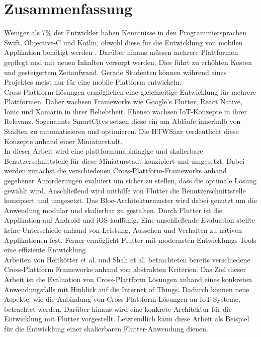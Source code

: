 \chapter*{Zusammenfassung}
Weniger als 7\% der Entwickler haben Kenntnisse in den Programmiersprachen Swift, Objective-C und Kotlin, obwohl diese für die Entwicklung von mobilen Applikation benötigt werden \cite{stachoverflow_stack_2019}. Darüber hinaus müssen mehrere Plattformen gepflegt und mit neuen Inhalten versorgt werden. Dies führt zu erhöhten Kosten und gesteigertem Zeitaufwand. Gerade Studenten können während eines Projektes meist nur für eine mobile Plattform entwickeln.\\
Cross-Plattform-Lösungen ermöglichen eine gleichzeitige Entwicklung für	 mehrere Plattformen. Daher wachsen Frameworks wie Google's Flutter, React Native, Ionic und \mbox{Xamarin} in ihrer Beliebtheit. Ebenso wachsen IoT-Konzepte in ihrer Relevanz. Sogenannte SmartCitys setzen diese ein um Abläufe innerhalb von Städten zu automatisieren und optimieren. Die HTWSaar verdeutlicht diese Konzepte anhand einer Miniaturstadt.\\
In dieser Arbeit wird eine plattformunabhängige und skalierbare Benutzerschnittstelle für diese Miniaturstadt konzipiert und umgesetzt.  Dabei werden zunächst die verschiedenen Cross-Plattform-Frameworks anhand gegebener Anforderungen evaluiert um sicher zu stellen, dass die optimale Lösung gewählt wird. Anschließend wird mithilfe von Flutter die Benutzerschnittstelle konzipiert und umgesetzt. Das Bloc-Architekturmuster wird dabei genutzt um die Anwendung modular und skalierbar zu gestalten. Durch Flutter ist die Applikation auf Android und iOS lauffähig. Eine anschließende Evaluation stellte keine Unterschiede anhand von Leistung, Aussehen und Verhalten zu nativen Applikationen fest. Ferner ermöglicht Flutter mit modernsten Entwicklungs-Tools eine effiziente Entwicklung.\\
Arbeiten von Heitkötter et al. \cite{heitkotter_evaluating_2013} und Shah et al. \cite{shah_analysis_2019} betrachteten bereits verschiedene Cross-Plattform Frameworks anhand von abstrakten Kriterien. Das Ziel dieser Arbeit ist die Evaluation von Cross-Plattform Lösungen anhand eines konkreten Anwendungsfalls mit Hinblick auf die Internet of Things. Dadurch können neue Aspekte, wie die Anbindung von Cross-Plattform Lösungen an IoT-Systeme, betrachtet werden. Darüber hinaus wird eine konkrete Architektur für die Entwicklung mit Flutter vorgestellt. Letztendlich kann diese Arbeit als Beispiel für die Entwicklung einer skalierbaren Flutter-Anwendung dienen. 





